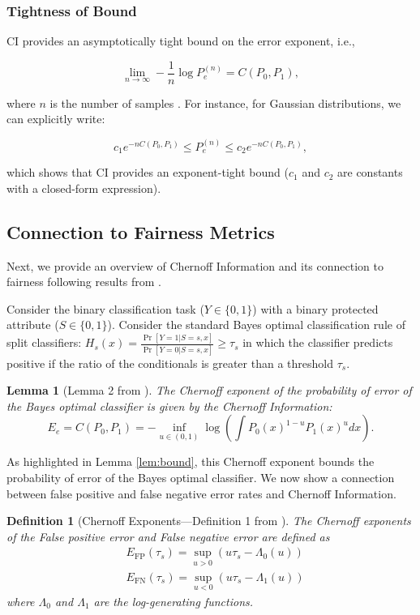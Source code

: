 \documentclass[11pt,letterpaper]{article}
\newtheorem{lemma}{Lemma}
\newtheorem{definition}{Definition}
\begin{document}
\subsubsection{Tightness of Bound} \label{sec:tightness}

CI provides an asymptotically tight bound on the error exponent, i.e.,

$$
\lim_{n \rightarrow \infty} -\frac{1}{n} \log P_e^{(n)} = C (P_0, P_1),
$$

where $n$ is the number of samples \citep{cover1999elements}. For instance, for Gaussian distributions, we can explicitly write:

$$
c_1 e^{-nC(P_0, P_1)} \leq P_e^{(n)} \leq c_2 e^{-nC(P_0, P_1)},
$$

which shows that CI provides an exponent-tight bound ($c_1$ and $c_2$ are constants with a closed-form expression).

\subsection{Connection to Fairness Metrics}

Next, we provide an overview of Chernoff Information and its connection to fairness following results from \citet{dutta2020there}. 


Consider the binary classification task ($Y \in \{0,1\}$) with a binary protected attribute ($S \in \{0,1\}$). Consider the standard Bayes optimal classification rule of split classifiers: $H_s(x) = \frac{\Pr[Y = 1|S =s, x]}{\Pr[Y = 0|S =s, x]} \geq \tau_s$ in which the classifier predicts positive if the ratio of the conditionals is greater than a threshold $\tau_s$.

\begin{lemma}
    [Lemma 2 from \citet{dutta2020there}] The Chernoff exponent of the probability of error of the Bayes optimal classifier is given by the Chernoff Information:
    \begin{equation}
        E_e = C(P_0, P_1) = -\inf_{u\in(0,1)} \log(\int P_0(x)^{1-u}P_1(x)^udx). 
    \end{equation}
\end{lemma}

As highlighted in Lemma \ref{lem:bound}, this Chernoff exponent bounds the probability of error of the Bayes optimal classifier. We now show a connection between false positive and false negative error rates and Chernoff Information.

\begin{definition}
    [Chernoff Exponents---Definition 1 from \citet{dutta2020there}] The Chernoff exponents of the False positive error and False negative error are defined as 
    \begin{align}
         & E_\text{FP}(\tau_s) = \sup_{u >0}(u\tau_s - \Lambda_0(u)) \\
         & E_\text{FN}(\tau_s) = \sup_{u <0}(u\tau_s - \Lambda_1(u))
    \end{align}
    where $\Lambda_0$ and $\Lambda_1$ are the log-generating functions.
\end{definition}
\end{document}
